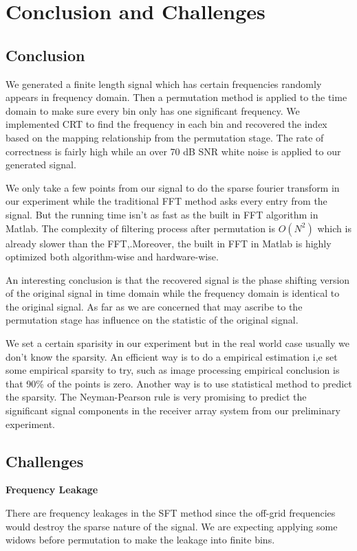 \documentclass[journal,transmag]{IEEEtran}
\begin{document}
\section{Conclusion and Challenges}
\subsection{Conclusion}
We generated a finite length signal which has certain frequencies randomly appears in frequency domain. Then a permutation method is applied to the time domain to make sure every bin only has one significant frequency. We implemented CRT to find the frequency in each bin and recovered the index based on the mapping relationship from the permutation stage. The rate of correctness is fairly high while an over 70 dB SNR white noise is applied to our generated signal.

We only take a few points from our signal to do the sparse fourier transform in our experiment while the traditional FFT method asks every entry from the signal. But the running time isn’t as fast as the built in FFT algorithm in Matlab. The complexity of filtering process after permutation is $O(N^2)$ which is already slower than the FFT,.Moreover, the built in FFT in Matlab is highly optimized both algorithm-wise and hardware-wise.

An interesting conclusion is that the recovered signal is the phase shifting version of the original signal in time domain while the frequency domain is identical to the original signal. As far as we are concerned that may ascribe to the permutation stage has influence on the statistic of the original signal.

We set a certain sparisity in our experiment but in the real world case usually we don’t know the sparsity. An efficient way is to do a empirical estimation i,e set some empirical sparsity to try, such as image processing empirical conclusion is that 90\% of the points is zero. Another way is to use statistical method to predict the sparsity. The Neyman-Pearson rule is very promising to predict the significant signal components in the receiver array system from our preliminary experiment. 

\subsection{Challenges}
\noindent \textbf{Frequency Leakage} 

	There are frequency leakages in the SFT method since the off-grid frequencies would destroy the sparse nature of the signal. We are expecting applying some widows before permutation to make the leakage into finite bins.
	
\end{document}
